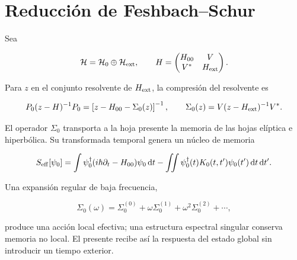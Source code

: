 \section{Reducci\'on de Feshbach--Schur}

Sea

\[
\mathcal H=\mathcal H_0\oplus\mathcal H_{\rm ext},
\qquad
H=
\begin{pmatrix}
H_{00}&V\\ V^*&H_{\rm ext}
\end{pmatrix}.
\]

Para \(z\) en el conjunto resolvente de \(H_{\rm ext}\), la compresi\'on del
resolvente es

\begin{equation}
P_0(z-H)^{-1}P_0
=\left[z-H_{00}-\Sigma_0(z)\right]^{-1},
\qquad
\Sigma_0(z)=V(z-H_{\rm ext})^{-1}V^*.
\label{rm:eq:rm-feshbach-schur}
\end{equation}

El operador \(\Sigma_0\) transporta a la hoja presente la memoria de las hojas
el\'iptica e hiperb\'olica. Su transformada temporal genera un n\'ucleo de
memoria

\[
S_{\rm eff}[\psi_0]
=\int\psi_0^\dagger(i\hbar\partial_t-H_{00})\psi_0\,\mathrm dt
-\iint\psi_0^\dagger(t)K_0(t,t')\psi_0(t')\,\mathrm dt\,\mathrm dt'.
\]

Una expansi\'on regular de baja frecuencia,

\[
\Sigma_0(\omega)
=\Sigma_0^{(0)}+\omega\Sigma_0^{(1)}
+\omega^2\Sigma_0^{(2)}+\cdots,
\]

produce una acci\'on local efectiva; una estructura espectral singular conserva
memoria no local. El presente recibe as\'i la respuesta del estado global sin
introducir un tiempo exterior.

